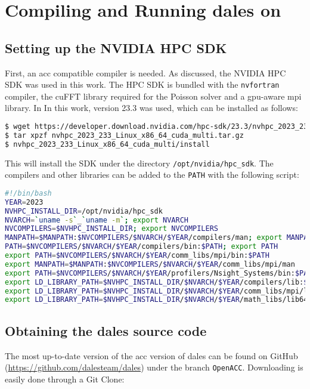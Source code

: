 \chapter{Compiling and Running \acrshort{dales} on }

\section{Setting up the NVIDIA HPC SDK}

First, an \acrshort{acc} compatible compiler is needed. As discussed, the NVIDIA HPC SDK was used in this work. The HPC SDK is bundled with the \texttt{nvfortran} compiler, the cuFFT library required for the Poisson solver and a \acrshort{gpu}-aware \acrshort{mpi} library. In In this work, version 23.3 was used, which can be installed as follows:

\begin{lstlisting}[language=bash, numbers=none]
$ wget https://developer.download.nvidia.com/hpc-sdk/23.3/nvhpc_2023_233_Linux_x86_64_cuda_multi.tar.gz
$ tar xpzf nvhpc_2023_233_Linux_x86_64_cuda_multi.tar.gz
$ nvhpc_2023_233_Linux_x86_64_cuda_multi/install
\end{lstlisting}

This will install the SDK under the directory \texttt{/opt/nvidia/hpc\_sdk}. The compilers and other libraries can be added to the \texttt{PATH} with the following script:

\begin{lstlisting}[language=bash]
#!/bin/bash
YEAR=2023
NVHPC_INSTALL_DIR=/opt/nvidia/hpc_sdk
NVARCH=`uname -s`_`uname -m`; export NVARCH
NVCOMPILERS=$NVHPC_INSTALL_DIR; export NVCOMPILERS
MANPATH=$MANPATH:$NVCOMPILERS/$NVARCH/$YEAR/compilers/man; export MANPATH
PATH=$NVCOMPILERS/$NVARCH/$YEAR/compilers/bin:$PATH; export PATH
export PATH=$NVCOMPILERS/$NVARCH/$YEAR/comm_libs/mpi/bin:$PATH
export MANPATH=$MANPATH:$NVCOMPILERS/$NVARCH/$YEAR/comm_libs/mpi/man
export PATH=$NVCOMPILERS/$NVARCH/$YEAR/profilers/Nsight_Systems/bin:$PATH
export LD_LIBRARY_PATH=$NVHPC_INSTALL_DIR/$NVARCH/$YEAR/compilers/lib:$LD_LIBRARY_PATH
export LD_LIBRARY_PATH=$NVHPC_INSTALL_DIR/$NVARCH/$YEAR/comm_libs/mpi/lib:$LD_LIBRARY_PATH
export LD_LIBRARY_PATH=$NVHPC_INSTALL_DIR/$NVARCH/$YEAR/math_libs/lib64:$LD_LIBRARY_PATH
\end{lstlisting}

\section{Obtaining the \acrshort{dales} source code}
The most up-to-date version of the \acrshort{acc} version of \acrshort{dales} can be found on GitHub (\url{https://github.com/dalesteam/dales}) under the branch \texttt{OpenACC}. Downloading is easily done through a Git Clone:

